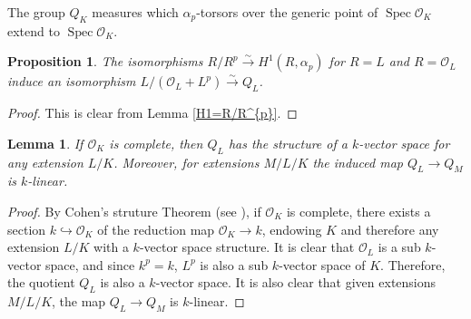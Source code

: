 \documentclass[a4paper,english,12pt]{amsart}
\newtheorem{proposition}[definition]{Proposition}
\newtheorem{lemma}[definition]{Lemma}
\numberwithin{equation}{section}
\DeclareMathOperator{\Spec}{Spec}
\renewcommand{\_}{\rule{0.25cm}{0.4pt}}
\begin{document}
The group $Q_{K}$ measures which $\alpha_{p}$-torsors over the generic point of $\Spec \mathcal{O}_{K}$ extend to $\Spec \mathcal{O}_{K}$.

\begin{proposition}\label{description of Q}
    The isomorphisms $R/R^{p}\xrightarrow{\sim} H^{1}(R,\alpha_{p})$ for $R=L$ and $R=\mathcal{O}_{L}$ induce an isomorphism $L/(\mathcal{O}_{L}+L^{p})\xrightarrow{\sim} Q_{L}$.
\end{proposition}
\begin{proof}
    This is clear from Lemma \ref{H1=R/R^{p}}.
\end{proof}

\begin{lemma}\label{Q is k^{p} vector space}
   If $\mathcal{O}_{K}$ is complete, then $Q_{L}$ has the structure of a $k$-vector space for any extension $L/K$. Moreover, for extensions $M/L/K$ the induced map $Q_{L}\to Q_{M}$ is $k$-linear.
\end{lemma}
\begin{proof}
    By Cohen's struture Theorem (see \cite[28.P]{matsumura}), if $\mathcal{O}_{K}$ is complete, there exists a section $k\hookrightarrow \mathcal{O}_{K}$ of the reduction map $\mathcal{O}_{K}\to k$, endowing $K$ and therefore any extension $L/K$ with a $k$-vector space structure. It is clear that $\mathcal{O}_{L}$ is a sub $k$-vector space, and since $k^{p}=k$, $L^{p}$ is also a sub $k$-vector space of $K$. Therefore, the quotient $Q_{L}$ is also a $k$-vector space. It is also clear that given extensions $M/L/K$, the map $Q_{L}\to Q_{M}$ is $k$-linear.
\end{proof}
\end{document}
